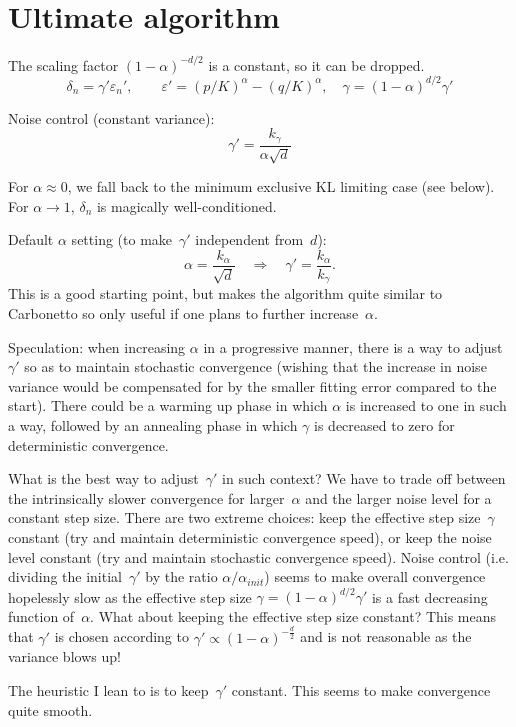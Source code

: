 \documentclass{article}
\begin{document}
\section{Ultimate algorithm}

The scaling factor $(1-\alpha)^{-d/2}$ is a constant, so it can be dropped. 
$$
\delta_n = \gamma' \varepsilon_n',
\qquad 
\varepsilon' = (p/K)^\alpha - (q/K)^\alpha,
\quad
\gamma = (1-\alpha)^{d/2} \gamma'
$$

Noise control (constant variance):
$$
\gamma' = \frac{k_\gamma}{\alpha\sqrt{d}}
$$

For $\alpha\approx 0$,  we fall back to the minimum exclusive KL limiting case (see below). For $\alpha\to 1$, $\delta_n$ is magically well-conditioned. 

Default $\alpha$ setting (to make~$\gamma'$ independent from~$d$):
$$
\alpha = \frac{k_\alpha}{\sqrt{d}}
\quad
\Rightarrow
\quad \gamma' = \frac{k_\alpha}{k_\gamma}.
$$
This is a good starting point, but makes the algorithm quite similar to Carbonetto so only useful if one plans to further increase~$\alpha$.

Speculation: when increasing $\alpha$ in a progressive manner, there is a way to adjust $\gamma'$ so as to maintain stochastic convergence (wishing that the increase in noise variance would be compensated for by the smaller fitting error compared to the start). There could be a warming up phase in which $\alpha$ is increased to one in such a way, followed by an annealing phase in which $\gamma$ is decreased to zero for deterministic convergence.

What is the best way to adjust~$\gamma'$ in such context? We have to trade off between the intrinsically slower convergence for larger~$\alpha$ and the larger noise level for a constant step size. There are two extreme choices: keep the effective step size~$\gamma$ constant (try and maintain deterministic convergence speed), or keep the noise level constant (try and maintain stochastic convergence speed). Noise control (i.e. dividing the initial~$\gamma'$ by the ratio $\alpha/\alpha_{init}$) seems to make overall convergence hopelessly slow as the effective step size $\gamma=(1-\alpha)^{d/2}\gamma'$ is a fast decreasing function of~$\alpha$. What about keeping the effective step size constant? This means that $\gamma'$ is chosen according to $\gamma' \propto (1-\alpha)^{-\frac{d}{2}}$ and is not reasonable as the variance blows up!

The heuristic I lean to is to keep~$\gamma'$ constant. This seems to make convergence quite smooth. 
\end{document}
